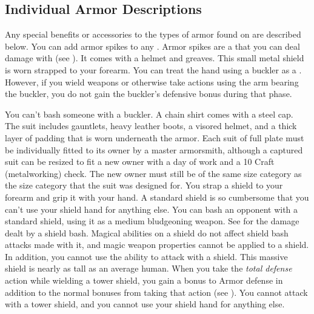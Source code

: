     \subsection{Individual Armor Descriptions}
        Any special benefits or accessories to the types of armor found on  are described below.
         You can add armor spikes to any .
        Armor spikes are a  that you can deal damage with (see ).
         It comes with a helmet and greaves.
         This small metal shield is worn strapped to your forearm.
        You can treat the hand using a buckler as a .
        However, if you wield weapons or otherwise take actions using the arm bearing the buckler, you do not gain the buckler's defensive bonus during that phase.
        \par You can't bash someone with a buckler.
         A chain shirt comes with a steel cap.
         The suit includes gauntlets, heavy leather boots, a visored helmet, and a thick layer of padding that is worn underneath the armor. Each suit of full plate must be individually fitted to its owner by a master armorsmith, although a captured suit can be resized to fit a new owner with a day of work and a  10 Craft (metalworking) check. The new owner must still be of the same size category as the size category that the suit was designed for.
         You strap a shield to your forearm and grip it with your hand. A standard shield is so cumbersome that you can't use your shield hand for anything else.
        \label{Shield Bash Attacks} You can bash an opponent with a standard shield, using it as a medium bludgeoning weapon. See  for the damage dealt by a shield bash.
        Magical abilities on a shield do not affect shield bash attacks made with it, and magic weapon properties cannot be applied to a shield.
        In addition, you cannot use the  ability to attack with a shield.
         This massive shield is nearly as tall as an average human.
        When you take the \textit{total defense} action while wielding a tower shield, you gain a  bonus to Armor defense in addition to the normal bonuses from taking that action (see ).
        You cannot attack with a tower shield, and you cannot use your shield hand for anything else.

